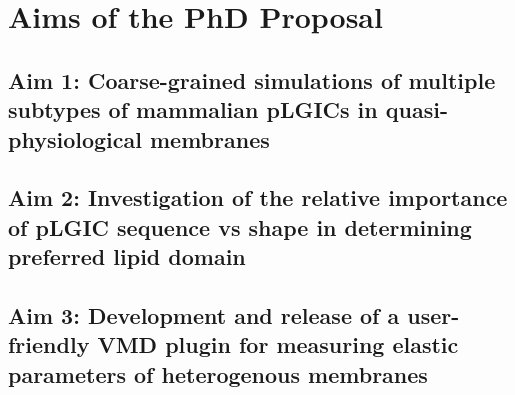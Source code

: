 \documentclass{article}
\begin{document}
\section{Aims of the PhD Proposal}

\subsection{Aim 1: Coarse-grained simulations of multiple subtypes of mammalian pLGICs in quasi-physiological membranes}

\subsection{Aim 2: Investigation of the relative importance of pLGIC sequence vs shape in determining preferred lipid domain}

\subsection{Aim 3: Development and release of a user-friendly VMD plugin for measuring elastic parameters of heterogenous membranes}

\printbibliography
\end{document}
